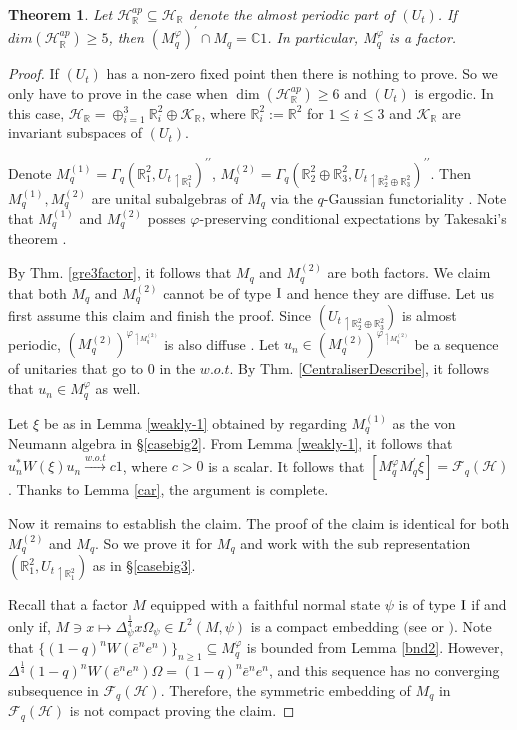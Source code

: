 \documentclass[12pt, a4paper,reqno]{amsart}
\newtheorem{Theorem}{Theorem}[section]
\theoremstyle{definition}
\renewcommand{\leq}{\leqslant}
\renewcommand{\geq}{\geqslant}
\def\C{\mathbb C}
\def\R{\mathbb R}
\newcommand{\CF}{\mathcal{F}}
\newcommand{\CH}{\mathcal{H}}
\begin{document}
\begin{Theorem}\label{trivial-rel-comm}
Let $\CH_\R^{ap}\subseteq \CH_\R$ denote the almost periodic part of $(U_t)$. If $dim(\CH_\R^{ap})\geq 5$, then  $(M_q^\varphi)^\prime\cap M_q=\C1$. In particular, $M_q^\varphi$ is a factor.
\end{Theorem}

\begin{proof}
If $(U_t)$ has a non-zero fixed point then there is nothing to prove. So we only have to prove in the case when $\dim(\CH_\R^{ap})\geq 6$ and $(U_t)$ is ergodic. In this case, $\CH_\R= \oplus_{i=1}^3\R^2_i \oplus \mathcal{K}_\R$, where $\R^2_i :=\R^2$ for $1\leq i\leq 3$ and $\mathcal{K}_\R$ are invariant subspaces of $(U_t)$.  

Denote $M_q^{(1)} =\Gamma_q(\R^2_1, {U_t}_{\upharpoonleft \R^2_1})^{\prime\prime}$, $M_q^{(2)}= \Gamma_q(\R^2_2\oplus \R_3^2, {U_t}_{\upharpoonleft \R^2_2\oplus \R_3^2})^{\prime\prime}$. Then $M_q^{(1)}, M_q^{(2)}$ are unital subalgebras of $M_q$ via the $q$-Gaussian functoriality \cite{Hiai}. Note that $M_q^{(1)}$ and $M_q^{(2)}$ posses $\varphi$-preserving conditional expectations by Takesaki's theorem \cite{Ta}. 

By Thm. \ref{gre3factor}, it follows that $M_q$ and $M_q^{(2)}$ are both factors. We claim that both $M_q$ and $M_q^{(2)}$ cannot be of type $\rm{I}$ and hence they are diffuse. Let us first assume this claim and finish the proof. Since $({U_t}_{\upharpoonleft \R^2_2\oplus \R_3^2})$ is almost periodic, $(M_q^{(2)})^{\varphi_{\upharpoonleft M_q^{(2)}}}$ is also diffuse \cite[Thm. 7.9]{DM20}. Let $u_n\in (M_q^{(2)})^{\varphi_{\upharpoonleft M_q^{(2)} }}$ be a sequence of unitaries that go to $0$ in the $w.o.t$. By Thm. \ref{CentraliserDescribe}, it follows that $u_n\in M_q^\varphi$ as well. 

Let $\xi$ be as in Lemma \ref{weakly-1} obtained by regarding $M_q^{(1)}$ as the von Neumann algebra in \S\ref{casebig2}. 
From Lemma \ref{weakly-1}, it follows that $u_n^* W(\xi) u_n\overset{w.o.t}\rightarrow c1$, where $c>0$ is a scalar. It follows that $[M_q^\varphi M_q^\prime \xi]=\mathcal{F}_q(\CH)$. Thanks to Lemma \ref{car}, the argument is complete.



Now it remains to establish the claim. The proof of the claim is identical for both $M_q^{(2)}$ and $M_q$. So we prove it for $M_q$ and work with the sub representation $(\R_1^2, {U_t}_{\upharpoonleft \R_1^2})$ as in \S\ref{casebig3}. 


Recall that a factor $M$ equipped with a faithful normal state $\psi$ is of type $\rm{I}$ if and only if, $M\ni x\mapsto \Delta_\psi^{\frac{1}{4}}x\Omega_\psi\in L^2(M,\psi)$ is a compact embedding $($see \cite[Cor. 2.9]{BDL} or \cite[Thm. 7.13]{DM20}$)$. 
Note that $\{(1-q)^{n}W({\bar e}^ne^n)\}_{n\geq 1}\subseteq M_q^\varphi$ is bounded from Lemma \ref{bnd2}. However, $\Delta^{\frac{1}{4}}(1-q)^{n}W({\bar e}^ne^n)\Omega= (1-q)^n{\bar e}^ne^n$, and this sequence has no converging subsequence in $ \CF_q(\CH) $. Therefore, the symmetric embedding of $M_q$ in $\mathcal{F}_q(\CH)$ is not compact proving the claim.
\end{proof}
\end{document}
